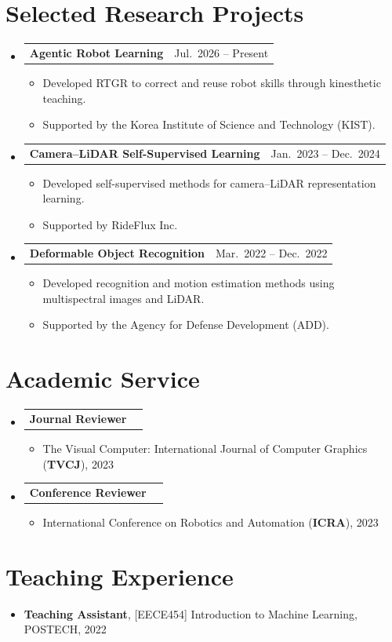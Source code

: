 \documentclass[letterpaper,11pt]{article}
\makeatletter
\newcommand{\resumeItem}[1]{
  \item\small{
    {#1 \vspace{-2pt}}
  }
}
\newcommand{\resumeProjectHeading}[2]{
    \item
    \begin{tabular*}{0.97\textwidth}{l@{\extracolsep{\fill}}r}
      \small#1 & #2 \\
    \end{tabular*}\vspace{-7pt}
}
\newcommand{\resumeSubHeadingListStart}{\begin{itemize}[leftmargin=0.15in, label={}]}
\newcommand{\resumeSubHeadingListEnd}{\end{itemize}}
\newcommand{\resumeItemListStart}{\begin{itemize}}
\newcommand{\resumeItemListEnd}{\end{itemize}\vspace{-5pt}}
\makeatother
\begin{document}
\section{Selected Research Projects}
    \resumeSubHeadingListStart
      \resumeProjectHeading
        {\textbf{Agentic Robot Learning}}{Jul.~2026 -- Present}
      \resumeItemListStart
        \resumeItem{Developed RTGR to correct and reuse robot skills through kinesthetic teaching.}
        \resumeItem{Supported by the Korea Institute of Science and Technology (KIST).}
      \resumeItemListEnd
      \resumeProjectHeading
        {\textbf{Camera--LiDAR Self-Supervised Learning}}{Jan.~2023 -- Dec.~2024}
      \resumeItemListStart
        \resumeItem{Developed self-supervised methods for camera--LiDAR representation learning.}
        \resumeItem{Supported by RideFlux Inc.}
      \resumeItemListEnd
      \resumeProjectHeading
        {\textbf{Deformable Object Recognition}}{Mar.~2022 -- Dec.~2022}
      \resumeItemListStart
        \resumeItem{Developed recognition and motion estimation methods using multispectral images and LiDAR.}
        \resumeItem{Supported by the Agency for Defense Development (ADD).}
      \resumeItemListEnd
    \resumeSubHeadingListEnd

\section{Academic Service}
    \resumeSubHeadingListStart
        \resumeProjectHeading
        {\textbf{Journal Reviewer}}{}
          \resumeItemListStart
            \resumeItem{The Visual Computer: International Journal of Computer Graphics (\textbf{TVCJ}), 2023}
          \resumeItemListEnd
        \resumeProjectHeading
        {\textbf{Conference Reviewer}}{}
          \resumeItemListStart
            \resumeItem{International Conference on Robotics and Automation (\textbf{ICRA}), 2023}
          \resumeItemListEnd
    \resumeSubHeadingListEnd

\section{Teaching Experience}
 \begin{itemize}[leftmargin=0.15in, label={}]
    \item{\small \textbf{Teaching Assistant}, [EECE454] Introduction to Machine Learning, POSTECH, 2022}
 \end{itemize}



\end{document}
